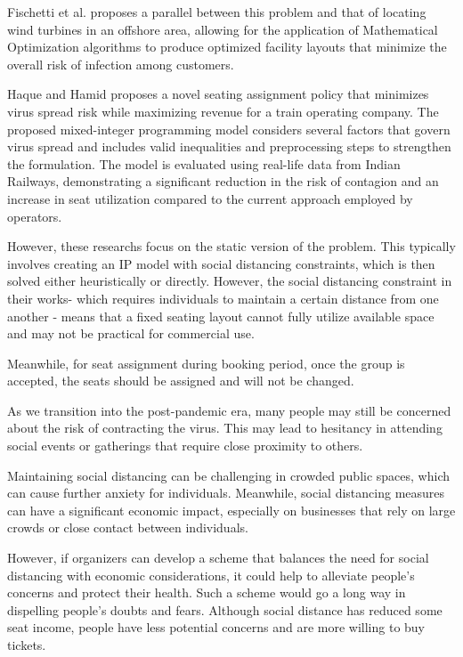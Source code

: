 Fischetti et al. \cite{fischetti2021safe} proposes a parallel between this problem and that of locating wind turbines in an offshore area, allowing for the application of Mathematical Optimization algorithms to produce optimized facility layouts that minimize the overall risk of infection among customers.

Haque and Hamid \cite{haque2023social} proposes a novel seating assignment policy that minimizes virus spread risk while maximizing revenue for a train operating company. The proposed mixed-integer programming model considers several factors that govern virus spread and includes valid inequalities and preprocessing steps to strengthen the formulation. The model is evaluated using real-life data from Indian Railways, demonstrating a significant reduction in the risk of contagion and an increase in seat utilization compared to the current approach employed by operators.

However, these researchs focus on the static version of the problem. This typically involves creating an IP model with social distancing constraints, which is then solved either heuristically or directly. However, the social distancing constraint in their works- which requires individuals to maintain a certain distance from one another - means that a fixed seating layout cannot fully utilize available space and may not be practical for commercial use.

Meanwhile, for seat assignment during booking period, once the group is accepted, the seats should be assigned and will not be changed. 


As we transition into the post-pandemic era, many people may still be concerned about the risk of contracting the virus. This may lead to hesitancy in attending social events or gatherings that require close proximity to others.

Maintaining social distancing can be challenging in crowded public spaces, which can cause further anxiety for individuals. Meanwhile, social distancing measures can have a significant economic impact, especially on businesses that rely on large crowds or close contact between individuals.

However, if organizers can develop a scheme that balances the need for social distancing with economic considerations, it could help to alleviate people's concerns and protect their health. Such a scheme would go a long way in dispelling people's doubts and fears. Although social distance has reduced some seat income, people have less potential concerns and are more willing to buy tickets.



